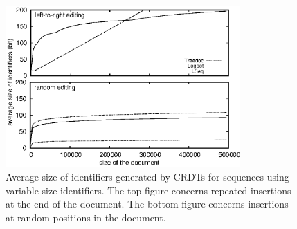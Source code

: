 \begin{figure}
  \centering
  \includegraphics[width=0.8\textwidth]{img/complexity.eps}
  \caption{\label{fig:complexity} Average size of identifiers generated by CRDTs
    for sequences using variable size identifiers. The top figure concerns
    repeated insertions at the end of the document. The bottom figure concerns
    insertions at random positions in the document.}
\end{figure}

